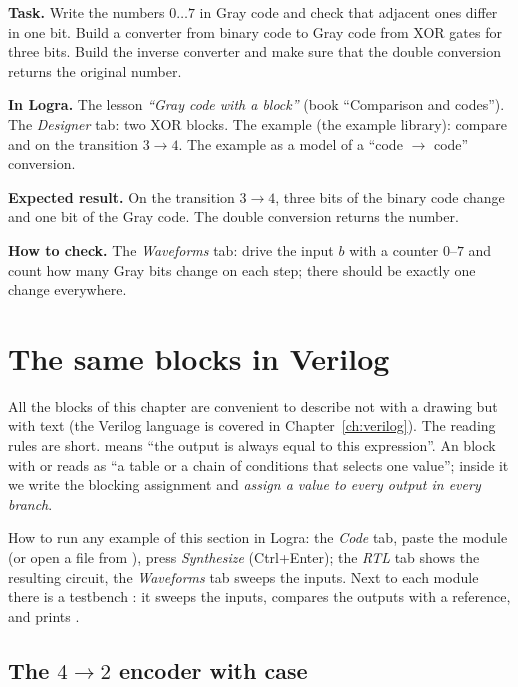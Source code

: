 \begin{diybox}
\textbf{Task.}  Write the numbers $0\ldots7$ in Gray code and
check that adjacent ones differ in one bit.  Build a
converter from binary code to Gray code from XOR gates for three bits.
 Build the inverse converter and make sure that the double
conversion returns the original number.

\textbf{In Logra.}  The lesson \emph{``Gray code with a block''} (book ``Comparison
and codes'').  The \emph{Designer} tab: two XOR blocks. The example
 (the example library): compare  and  on
the transition $3\to4$.  The example  as a model of
a ``code $\to$ code'' conversion.

\textbf{Expected result.} On the transition $3\to4$, three
bits of the binary code change and one bit of the Gray code. The double conversion
returns the number.

\textbf{How to check.} The \emph{Waveforms} tab: drive the input $b$ with a
counter $0$--$7$ and count how many Gray bits change on
each step; there should be exactly one change everywhere.
\end{diybox}

\section{The same blocks in Verilog}
\label{sec:coders-verilog}

All the blocks of this chapter are convenient to describe not with a drawing
but with text (the Verilog language is covered in
Chapter~\ref{ch:verilog}). The reading rules are short.
 means ``the output is always equal to this expression''.
An  block with  or  reads as ``a table or
a chain of conditions that selects one value''; inside it we write the
blocking assignment \code{=} and \emph{assign a value to every output in every
branch}.

How to run any example of this section in Logra: the \emph{Code} tab, paste
the module (or open a file from ), press
\emph{Synthesize} (Ctrl+Enter); the \emph{RTL} tab shows the resulting
circuit, the \emph{Waveforms} tab sweeps the inputs. Next to each module there
is a testbench : it sweeps the inputs, compares the outputs with a
reference, and prints .

\subsection{The $4\to2$ encoder with case}

